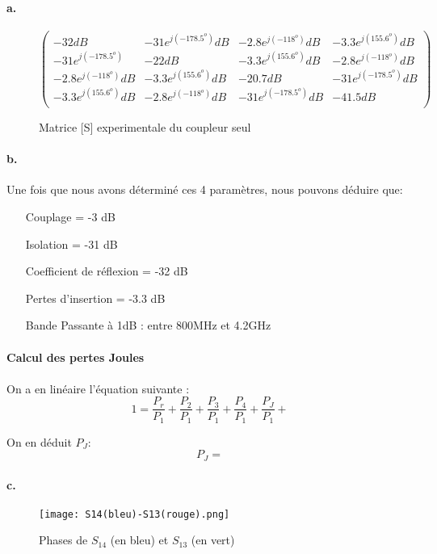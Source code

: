 \documentclass[oneside,a4paper,12pt]{article}
\begin{document}
	\paragraph{a.}
	\begin{figure}
		\centering
		$
		\begin{pmatrix}
			-32 dB & -31 e^{j(-178.5^{o})} dB & -2.8 e^{j(-118^{o})} dB & -3.3 e^{j(155.6^{o})} dB \\
			-31 e^{j(-178.5^{o})} & -22 dB & -3.3 e^{j(155.6^{o})} dB & -2.8 e^{j(-118^{o})} dB \\
			-2.8 e^{j(-118^{o})} dB & -3.3 e^{j(155.6^{o})} dB & -20.7 dB & -31 e^{j(-178.5^{o})} dB \\
			-3.3 e^{j(155.6^{o})} dB & -2.8 e^{j(-118^{o})} dB & -31 e^{j(-178.5^{o})} dB & -41.5 dB \\
		\end{pmatrix}
		$
		\caption{Matrice [S] experimentale du coupleur seul}
	\end{figure}

	\paragraph{b.}
	Une fois que nous avons déterminé ces 4 paramètres, nous pouvons déduire que:

	\begin{itemize}
		\item[Couplage] = -3 dB
		\item[Isolation] = -31 dB 
		\item[Coefficient de réflexion] = -32 dB
		\item[Pertes d'insertion] = -3.3 dB  
		\item[Bande Passante à 1dB] : entre 800MHz et 4.2GHz 
	\end{itemize}
	
	\paragraph{Calcul des pertes Joules}
	\paragraph{}
	On a en linéaire l'équation suivante : 
	\[ 1 = \frac{P_{r}}{P_{1}} + \frac{P_{2}}{P_{1}} + \frac{P_{3}}{P_{1}} + \frac{P_{4}}{P_{1}} + \frac{P_{J}}{P_{1}} + \]

	On en déduit $ P_{J} $:
	\[ P_{J} =  \]

	\paragraph{c.}
	\begin{figure}
		\centering
		\texttt{[image: S14(bleu)-S13(rouge).png]}
		\caption{Phases de $S_{14}$ (en bleu) et $S_{13}$ (en vert)}
	\end{figure}
\end{document}

